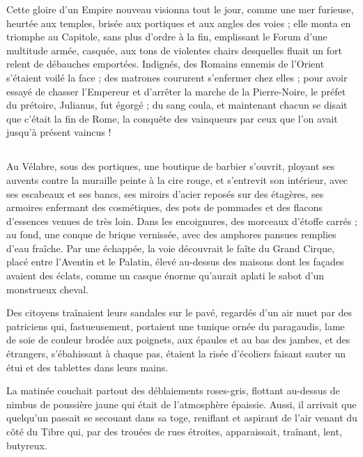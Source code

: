 \documentclass[a4paper, 11pt, oneside, polutonikogreek, french]{article}
\begin{document}
Cette gloire d'un Empire nouveau visionna tout le jour, comme une mer furieuse, heurtée aux temples, brisée aux portiques et aux angles des voies ; elle monta en triomphe au Capitole, sans plus d'ordre à la fin, emplissant le Forum d'une multitude armée, casquée, aux tons de violentes chairs desquelles fluait un fort relent de débauches emportées. Indignés, des Romains ennemis de l'Orient s'étaient voilé la face ; des matrones coururent s'enfermer chez elles ; pour avoir essayé de chasser l'Empereur et d'arrêter la marche de la Pierre-Noire, le préfet du prétoire, Julianus, fut égorgé ; du sang coula, et maintenant chacun se disait que c'était la fin de Rome, la conquête des vainqueurs par ceux que l'on avait jusqu'à présent vaincus !
\clearpage
\subsection{}
\paragraph{}
Au Vélabre, sous des portiques, une boutique de barbier s'ouvrit, ployant ses auvents contre la muraille peinte à la cire rouge, et s'entrevit son intérieur, avec ses escabeaux et ses bancs, ses miroirs d'acier reposés sur des étagères, ses armoires enfermant des cosmétiques, des pots de pommades et des flacons d'essences venues de très loin. Dans les encoignures, des morceaux d'étoffe carrés ; au fond, une conque de brique vernissée, avec des amphores pansues remplies d'eau fraîche. Par une échappée, la voie découvrait le faîte du Grand Cirque, placé entre l'Aventin et le Palatin, élevé au-dessus des maisons dont les façades avaient des éclats, comme un casque énorme qu'aurait aplati le sabot d'un monstrueux cheval.

Des citoyens traînaient leurs sandales sur le pavé, regardés d'un air muet par des patriciens qui, fastueusement, portaient une tunique ornée du paragaudis, lame de soie de couleur brodée aux poignets, aux épaules et au bas des jambes, et des étrangers, s'ébahissant à chaque pas, étaient la risée d'écoliers faisant sauter un étui et des tablettes dans leurs mains.

La matinée couchait partout des déblaiements roses-gris, flottant au-dessus de nimbus de poussière jaune qui était de l'atmosphère épaissie. Aussi, il arrivait que quelqu'un passait se secouant dans sa toge, reniflant et aspirant de l'air venant du côté du Tibre qui, par des trouées de rues étroites, apparaissait, traînant, lent, butyreux.
\end{document}
